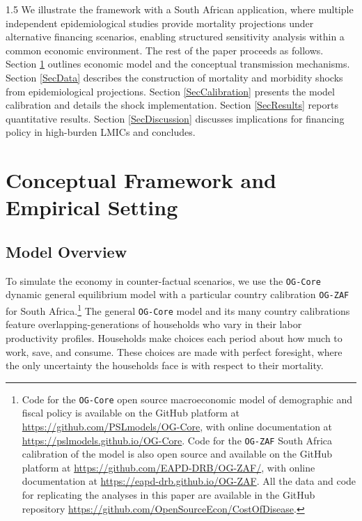 \documentclass[letterpaper,12pt]{article}
\theoremstyle{definition}
\begin{document}
\begin{spacing}{1.5}
We illustrate the framework with a South African application, where multiple independent epidemiological studies provide mortality projections under alternative financing scenarios, enabling structured sensitivity analysis within a common economic environment. The rest of the paper proceeds as follows. Section \ref{SecFramework} outlines economic model and the conceptual transmission mechanisms. Section \ref{SecData} describes the construction of mortality and morbidity shocks from epidemiological projections. Section \ref{SecCalibration} presents the model calibration and details the shock implementation. Section \ref{SecResults} reports quantitative results. Section \ref{SecDiscussion} discusses implications for financing policy in high-burden LMICs and concludes.

\section{Conceptual Framework and Empirical Setting}\label{SecFramework}


  \subsection{Model Overview}\label{SecModelOverview}

  To simulate the economy in counter-factual scenarios, we use the \texttt{OG-Core} dynamic general equilibrium model with a particular country calibration \texttt{OG-ZAF} for South Africa.\footnote{Code for the \texttt{OG-Core} open source macroeconomic model of demographic and fiscal policy is available on the GitHub platform at \href{https://github.com/PSLmodels/OG-Core}{https://github.com/PSLmodels/OG-Core}, with online documentation at \href{https://pslmodels.github.io/OG-Core}{https://pslmodels.github.io/OG-Core}. Code for the \texttt{OG-ZAF} South Africa calibration of the model is also open source and available on the GitHub platform at \href{https://github.com/EAPD-DRB/OG-ZAF/}{https://github.com/EAPD-DRB/OG-ZAF/}, with online documentation at \href{https://eapd-drb.github.io/OG-ZAF}{https://eapd-drb.github.io/OG-ZAF}. All the data and code for replicating the analyses in this paper are available in the GitHub repository \href{https://github.com/OpenSourceEcon/CostOfDisease}{https://github.com/OpenSourceEcon/CostOfDisease}.} The general \texttt{OG-Core} model and its many country calibrations feature overlapping-generations of households who vary in their labor productivity profiles. Households make choices each period about how much to work, save, and consume. These choices are made with perfect foresight, where the only uncertainty the households face is with respect to their mortality.


\end{spacing}
\end{document}

